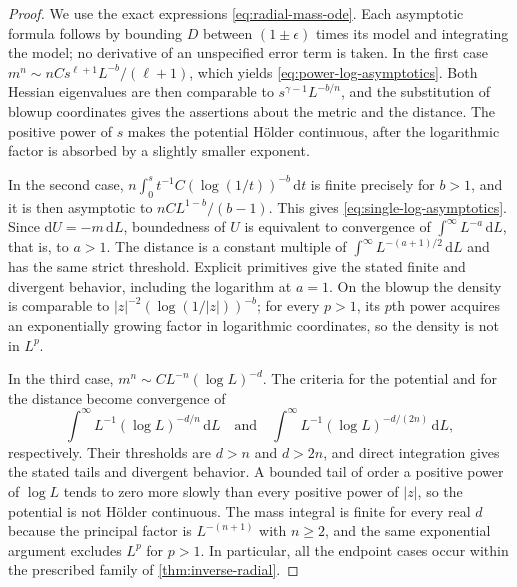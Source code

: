 \begin{proof}
We use the exact expressions \eqref{eq:radial-mass-ode}. Each asymptotic formula follows by bounding $D$ between $(1\pm\epsilon)$ times its model and integrating the model; no derivative of an unspecified error term is taken. In the first case $m^n\sim nC s^{\ell+1}L^{-b}/(\ell+1)$, which yields \eqref{eq:power-log-asymptotics}. Both Hessian eigenvalues are then comparable to $s^{\gamma-1}L^{-b/n}$, and the substitution of blowup coordinates gives the assertions about the metric and the distance. The positive power of $s$ makes the potential H\"older continuous, after the logarithmic factor is absorbed by a slightly smaller exponent.

In the second case, $n\int_0^s t^{-1}C(\log(1/t))^{-b}\,\mathrm{d} t$ is finite precisely for $b>1$, and it is then asymptotic to $nC L^{1-b}/(b-1)$. This gives \eqref{eq:single-log-asymptotics}. Since $\mathrm{d} U=-m\,\mathrm{d} L$, boundedness of $U$ is equivalent to convergence of $\int^\infty L^{-a}\,\mathrm{d} L$, that is, to $a>1$. The distance is a constant multiple of $\int^\infty L^{-(a+1)/2}\,\mathrm{d} L$ and has the same strict threshold. Explicit primitives give the stated finite and divergent behavior, including the logarithm at $a=1$. On the blowup the density is comparable to $|z|^{-2}(\log(1/|z|))^{-b}$; for every $p>1$, its $p$th power acquires an exponentially growing factor in logarithmic coordinates, so the density is not in $L^p$.

In the third case, $m^n\sim C L^{-n}(\log L)^{-d}$. The criteria for the potential and for the distance become convergence of
\[
 \int^\infty L^{-1}(\log L)^{-d/n}\,\mathrm{d} L
 \quad\text{and}\quad
 \int^\infty L^{-1}(\log L)^{-d/(2n)}\,\mathrm{d} L,
\]
respectively. Their thresholds are $d>n$ and $d>2n$, and direct integration gives the stated tails and divergent behavior. A bounded tail of order a positive power of $\log L$ tends to zero more slowly than every positive power of $|z|$, so the potential is not H\"older continuous. The mass integral is finite for every real $d$ because the principal factor is $L^{-(n+1)}$ with $n\geq2$, and the same exponential argument excludes $L^p$ for $p>1$. In particular, all the endpoint cases occur within the prescribed family of \cref{thm:inverse-radial}.
\end{proof}
